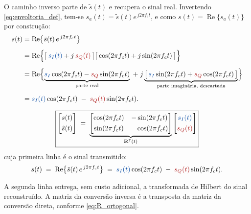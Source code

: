 \documentclass[11pt,a4paper]{article}
\begin{document}
O caminho inverso parte de $\tilde{s}(t)$ e recupera o sinal real. Invertendo \eqref{eq:envoltoria_def}, tem-se $s_a(t) = \tilde{s}(t)e^{\,j2\pi f_c t}$, e como $s(t) = \operatorname{Re}\{s_a(t)\}$ por construção:
\begin{align}
  s(t)
  &= \operatorname{Re}\bigl\{\tilde{s}(t)\, e^{\,j2\pi f_c t}\bigr\}
  \label{eq:bp_passo1}\\[0.5em]
  &= \operatorname{Re}\Bigl\{\bigl[\,\textcolor{azul}{s_I(t)} + j\,\textcolor{vermelho}{s_Q(t)}\,\bigr]
     \bigl[\,\cos(2\pi f_c t) + j\sin(2\pi f_c t)\,\bigr]\Bigr\}
  \label{eq:bp_passo2}\\[0.5em]
  &= \operatorname{Re}\Bigl\{
     \underbrace{\textcolor{azul}{s_I}\cos(2\pi f_c t) - \textcolor{vermelho}{s_Q}\sin(2\pi f_c t)}_{\text{parte real}}
     \;+\; j\underbrace{\bigl[\,\textcolor{azul}{s_I}\sin(2\pi f_c t) + \textcolor{vermelho}{s_Q}\cos(2\pi f_c t)\,\bigr]}_{\text{parte imaginária, descartada}}\Bigr\}
  \label{eq:bp_passo3}\\[0.5em]
  &= \textcolor{azul}{s_I(t)}\cos(2\pi f_c t) \;-\; \textcolor{vermelho}{s_Q(t)}\sin(2\pi f_c t).
  \label{eq:bp_passo4}
\end{align}

\begin{quadro}
\[
  \boxed{
  \begin{bmatrix} s(t) \\[0.35em] \hat{s}(t) \end{bmatrix}
  \;=\;
  \underbrace{\begin{bmatrix}
    \cos(2\pi f_c t) & -\sin(2\pi f_c t) \\[0.35em]
    \sin(2\pi f_c t) & \phantom{-}\cos(2\pi f_c t)
  \end{bmatrix}}_{\mathbf{R}^{\mathsf{T}}(t)}
  \begin{bmatrix} \textcolor{azul}{s_I(t)} \\[0.35em] \textcolor{vermelho}{s_Q(t)} \end{bmatrix}}
\]
cuja primeira linha é o sinal transmitido:
\[
  s(t) \;=\; \operatorname{Re}\bigl\{\tilde{s}(t)\, e^{\,j2\pi f_c t}\bigr\}
   \;=\; \textcolor{azul}{s_I(t)}\cos(2\pi f_c t) \;-\; \textcolor{vermelho}{s_Q(t)}\sin(2\pi f_c t).
\]
\end{quadro}

A segunda linha entrega, sem custo adicional, a transformada de Hilbert do sinal reconstruído. A matriz da conversão inversa é a transposta da matriz da conversão direta, conforme \eqref{eq:R_ortogonal}.
\end{document}
